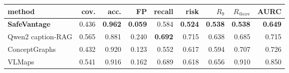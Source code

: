 \begin{tabular}{lrrrrrrrr}
\toprule
method & cov. & acc. & FP & recall & risk & $R_{9}$ & $R_{@\mathrm{cov}}$ & AURC \\
\midrule
\textbf{SafeVantage} & 0.436 & \textbf{0.962} & \textbf{0.059} & 0.584 & \textbf{0.524} & \textbf{0.538} & \textbf{0.538} & \textbf{0.649} \\
Qwen2 caption-RAG & 0.565 & 0.881 & 0.240 & \textbf{0.692} & 0.715 & 0.638 & 0.685 & 0.715 \\
ConceptGraphs & 0.432 & 0.920 & 0.123 & 0.552 & 0.617 & 0.594 & 0.707 & 0.726 \\
VLMaps & 0.541 & 0.916 & 0.162 & 0.689 & 0.618 & 0.656 & 0.910 & 0.850 \\
\bottomrule
\end{tabular}
